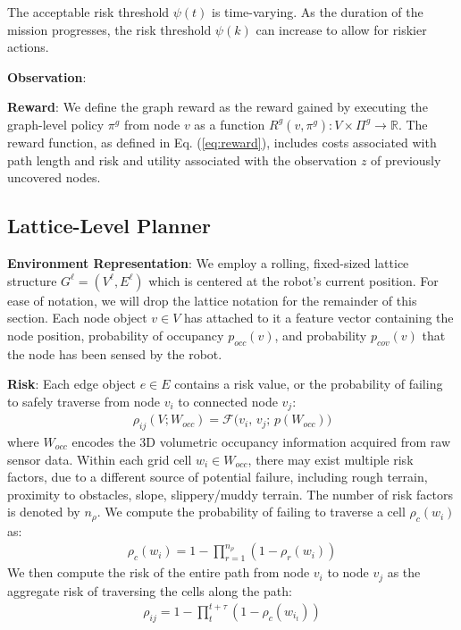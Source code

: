 \documentclass{article}
\newcommand{\ph}[1]{{\textbf{#1}:}} %
\begin{document}
The acceptable risk threshold $\psi(t)$ is time-varying. As the duration of the mission progresses, the risk threshold $\psi(k)$ can increase to allow for riskier actions.

\ph{Observation}

\ph{Reward} We define the graph reward as the reward gained by executing the graph-level policy $\pi^g$ from node $v$ as a function $R^g(v, \pi^g): V \times \Pi^g \to \mathbb{R}$. The reward function, as defined in Eq. (\ref{eq:reward}), includes costs associated with path length and risk and utility associated with the observation $z$ of previously uncovered nodes. 


\subsection{Lattice-Level Planner} 

\ph{Environment Representation} We employ a rolling, fixed-sized lattice structure $G^\ell = (V^\ell, E^\ell)$ which is centered at the robot's current position. For ease of notation, we will drop the lattice notation for the remainder of this section. Each node object $v \in V$ has attached to it a feature vector containing the node position, probability of occupancy $p_{occ}(v)$, and probability $p_{cov}(v)$ that the node has been sensed by the robot. 

\ph{Risk} Each edge object $e \in E$ contains a risk value, or the probability of failing to safely traverse from node $v_i$ to connected node $v_j$:
\begin{align}
    \rho_{ij}(V; W_{occ}) = \mathcal{F} \big(v_i, \, v_j; \, p(W_{occ})\big)
\end{align}
where $W_{occ}$ encodes the 3D volumetric occupancy information acquired from raw sensor data. Within each grid cell $w_i \in W_{occ}$, there may exist multiple risk factors, due to a different source of potential failure, including rough terrain, proximity to obstacles, slope, slippery/muddy terrain. The number of risk factors is denoted by $n_\rho$. We compute the probability of failing to traverse a cell $\rho_c(w_i)$ as:
\begin{align}
    \rho_c(w_i) = 1-\prod_{r=1}^{n_\rho} (1-\rho_r(w_i))
\end{align}
We then compute the risk of the entire path from node $v_i$ to node $v_j$ as the aggregate risk of traversing the cells along the path:
\begin{align}
    \rho_{ij} = 1-\prod_t^{t+\tau}(1-\rho_c(w_{i_t}))
\end{align}
\end{document}
